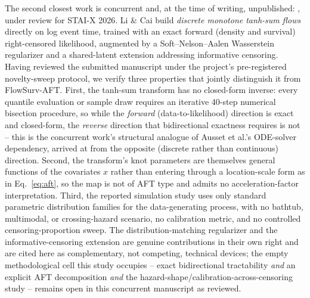 \documentclass[11pt]{article}
\begin{document}
The second closest work is concurrent and, at the time of writing,
unpublished: \citet{licai2026}, under review for STAI-X 2026. Li \& Cai
build \emph{discrete monotone tanh-sum flows} directly on log event time,
trained with an exact forward (density and survival) right-censored
likelihood, augmented by a Soft--Nelson--Aalen Wasserstein regularizer and
a shared-latent extension addressing informative censoring. Having
reviewed the submitted manuscript under the project's pre-registered
novelty-sweep protocol, we verify three properties that jointly
distinguish it from FlowSurv-AFT. First, the tanh-sum transform has no
closed-form inverse: every quantile evaluation or sample draw requires an
iterative 40-step numerical bisection procedure, so while the
\emph{forward} (data-to-likelihood) direction is exact and closed-form,
the \emph{reverse} direction that bidirectional exactness requires is not
-- this is the concurrent work's structural analogue of Ausset et al.'s
ODE-solver dependency, arrived at from the opposite (discrete rather than
continuous) direction. Second, the transform's knot parameters are
themselves general functions of the covariates $x$ rather than entering
through a location-scale form as in Eq.~\eqref{eq:aft}, so the map is not
of AFT type and admits no acceleration-factor interpretation. Third, the
reported simulation study uses only standard parametric distribution
families for the data-generating process, with no bathtub, multimodal, or
crossing-hazard scenario, no calibration metric, and no controlled
censoring-proportion sweep. The distribution-matching regularizer and the
informative-censoring extension are genuine contributions in their own
right and are cited here as complementary, not competing, technical
devices; the empty methodological cell this study occupies -- exact
bidirectional tractability \emph{and} an explicit AFT decomposition
\emph{and} the hazard-shape/calibration-across-censoring study -- remains
open in this concurrent manuscript as reviewed.
\end{document}
